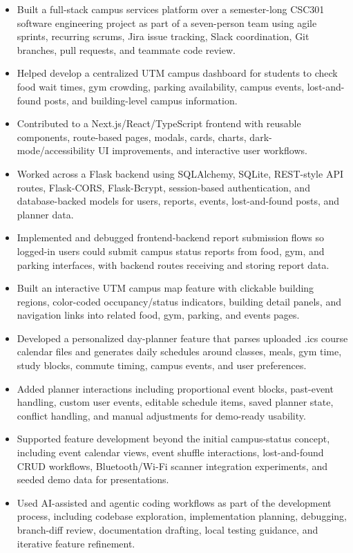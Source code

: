 \documentclass[10.5pt,letterpaper]{article}
\begin{document}
\begin{itemize}
\item Built a full-stack campus services platform over a semester-long CSC301 software engineering project as part of a seven-person team using agile sprints, recurring scrums, Jira issue tracking, Slack coordination, Git branches, pull requests, and teammate code review.
\item Helped develop a centralized UTM campus dashboard for students to check food wait times, gym crowding, parking availability, campus events, lost-and-found posts, and building-level campus information.
\item Contributed to a Next.js/React/TypeScript frontend with reusable components, route-based pages, modals, cards, charts, dark-mode/accessibility UI improvements, and interactive user workflows.
\item Worked across a Flask backend using SQLAlchemy, SQLite, REST-style API routes, Flask-CORS, Flask-Bcrypt, session-based authentication, and database-backed models for users, reports, events, lost-and-found posts, and planner data.
\item Implemented and debugged frontend-backend report submission flows so logged-in users could submit campus status reports from food, gym, and parking interfaces, with backend routes receiving and storing report data.
\item Built an interactive UTM campus map feature with clickable building regions, color-coded occupancy/status indicators, building detail panels, and navigation links into related food, gym, parking, and events pages.
\item Developed a personalized day-planner feature that parses uploaded .ics course calendar files and generates daily schedules around classes, meals, gym time, study blocks, commute timing, campus events, and user preferences.
\item Added planner interactions including proportional event blocks, past-event handling, custom user events, editable schedule items, saved planner state, conflict handling, and manual adjustments for demo-ready usability.
\item Supported feature development beyond the initial campus-status concept, including event calendar views, event shuffle interactions, lost-and-found CRUD workflows, Bluetooth/Wi-Fi scanner integration experiments, and seeded demo data for presentations.
\item Used AI-assisted and agentic coding workflows as part of the development process, including codebase exploration, implementation planning, debugging, branch-diff review, documentation drafting, local testing guidance, and iterative feature refinement.

\end{itemize}
\end{document}
